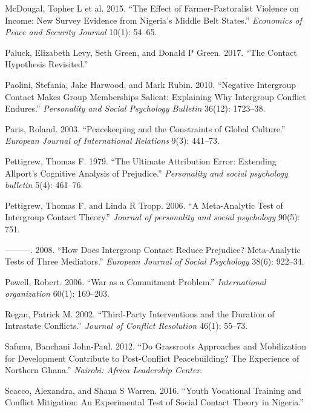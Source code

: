 \documentclass[11pt]{article}
\begin{document}
\hypertarget{ref-mcdougal2015effect}{}
McDougal, Topher L et al. 2015. ``The Effect of Farmer-Pastoralist
Violence on Income: New Survey Evidence from Nigeria's Middle Belt
States.'' \emph{Economics of Peace and Security Journal} 10(1): 54--65.

\hypertarget{ref-paluck2017contact}{}
Paluck, Elizabeth Levy, Seth Green, and Donald P Green. 2017. ``The
Contact Hypothesis Revisited.''

\hypertarget{ref-paolini2010negative}{}
Paolini, Stefania, Jake Harwood, and Mark Rubin. 2010. ``Negative
Intergroup Contact Makes Group Memberships Salient: Explaining Why
Intergroup Conflict Endures.'' \emph{Personality and Social Psychology
Bulletin} 36(12): 1723--38.

\hypertarget{ref-paris2003peacekeeping}{}
Paris, Roland. 2003. ``Peacekeeping and the Constraints of Global
Culture.'' \emph{European Journal of International Relations} 9(3):
441--73.

\hypertarget{ref-pettigrew1979ultimate}{}
Pettigrew, Thomas F. 1979. ``The Ultimate Attribution Error: Extending
Allport's Cognitive Analysis of Prejudice.'' \emph{Personality and
social psychology bulletin} 5(4): 461--76.

\hypertarget{ref-pettigrew2006meta}{}
Pettigrew, Thomas F, and Linda R Tropp. 2006. ``A Meta-Analytic Test of
Intergroup Contact Theory.'' \emph{Journal of personality and social
psychology} 90(5): 751.

\hypertarget{ref-pettigrew2008does}{}
---------. 2008. ``How Does Intergroup Contact Reduce Prejudice?
Meta-Analytic Tests of Three Mediators.'' \emph{European Journal of
Social Psychology} 38(6): 922--34.

\hypertarget{ref-powell2006war}{}
Powell, Robert. 2006. ``War as a Commitment Problem.''
\emph{International organization} 60(1): 169--203.

\hypertarget{ref-regan2002third}{}
Regan, Patrick M. 2002. ``Third-Party Interventions and the Duration of
Intrastate Conflicts.'' \emph{Journal of Conflict Resolution} 46(1):
55--73.

\hypertarget{ref-safunu2012grassroots}{}
Safunu, Banchani John-Paul. 2012. ``Do Grassroots Approaches and
Mobilization for Development Contribute to Post-Conflict Peacebuilding?
The Experience of Northern Ghana.'' \emph{Nairobi: Africa Leadership
Center}.

\hypertarget{ref-Scacco2016}{}
Scacco, Alexandra, and Shana S Warren. 2016. ``Youth Vocational Training
and Conflict Mitigation: An Experimental Test of Social Contact Theory
in Nigeria.''
\end{document}
